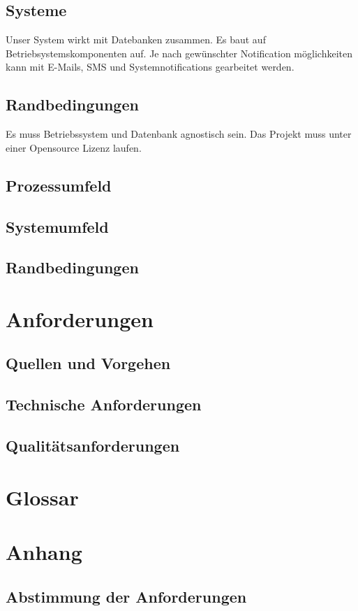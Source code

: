 \documentclass[11pt,titelpage]{scrreprt}
\begin{document}
\subsection{Systeme}
Unser System wirkt mit Datebanken zusammen. Es baut auf Betriebsystemskomponenten auf.
Je nach gewünschter Notification möglichkeiten kann mit E-Mails, SMS und Systemnotifications gearbeitet werden.
\subsection{Randbedingungen}
Es muss Betriebssystem und Datenbank agnostisch sein. Das Projekt muss unter einer Opensource Lizenz laufen.


\subsection{Prozessumfeld}
\subsection{Systemumfeld}
\subsection{Randbedingungen}
\section{Anforderungen}
\subsection{Quellen und Vorgehen}
\subsection{Technische Anforderungen}
\subsection{Qualitätsanforderungen}
\section{Glossar}
\listoffigures
\listoftables

\section{Anhang}

\subsection{Abstimmung der Anforderungen}
\end{document}
